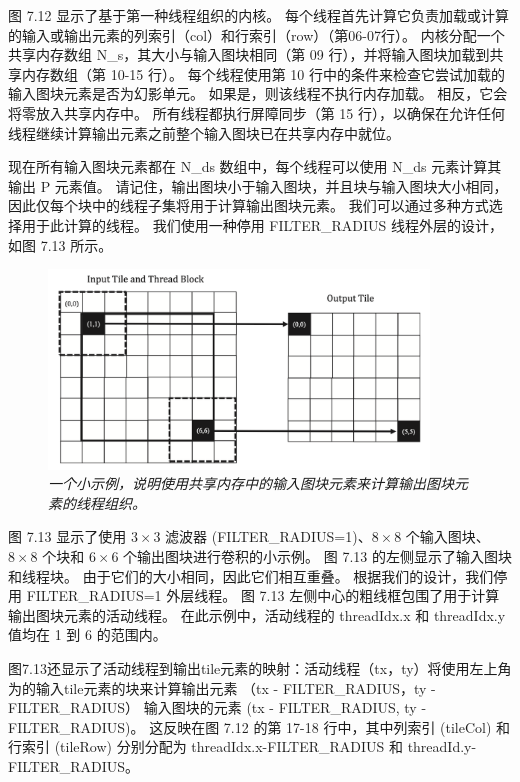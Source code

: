 图 7.12 显示了基于第一种线程组织的内核。 
每个线程首先计算它负责加载或计算的输入或输出元素的列索引（col）和行索引（row）（第06-07行）。 
内核分配一个共享内存数组 N\_s，其大小与输入图块相同（第 09 行），并将输入图块加载到共享内存数组（第 10-15 行）。 
每个线程使用第 10 行中的条件来检查它尝试加载的输入图块元素是否为幻影单元。 
如果是，则该线程不执行内存加载。 相反，它会将零放入共享内存中。 
所有线程都执行屏障同步（第 15 行），以确保在允许任何线程继续计算输出元素之前整个输入图块已在共享内存中就位。

现在所有输入图块元素都在 N\_ds 数组中，每个线程可以使用 N\_ds 元素计算其输出 P 元素值。 
请记住，输出图块小于输入图块，并且块与输入图块大小相同，因此仅每个块中的线程子集将用于计算输出图块元素。 
我们可以通过多种方式选择用于此计算的线程。 我们使用一种停用 FILTER\_RADIUS 线程外层的设计，如图 7.13 所示。

\begin{figure}[H]
	\centering
	\includegraphics[width=0.9\textwidth]{figs/F7.13.png}
	\caption{\textit{一个小示例，说明使用共享内存中的输入图块元素来计算输出图块元素的线程组织。}}
\end{figure}

图 7.13 显示了使用 $3 \times 3$ 滤波器 (FILTER\_RADIUS=1)、$8 \times 8$ 个输入图块、
$8 \times 8$ 个块和 $6 \times 6$ 个输出图块进行卷积的小示例。 
图 7.13 的左侧显示了输入图块和线程块。 由于它们的大小相同，因此它们相互重叠。 
根据我们的设计，我们停用 FILTER\_RADIUS=1 外层线程。 
图 7.13 左侧中心的粗线框包围了用于计算输出图块元素的活动线程。 
在此示例中，活动线程的 threadIdx.x 和 threadIdx.y 值均在 1 到 6 的范围内。

图7.13还显示了活动线程到输出tile元素的映射：活动线程（tx，ty）将使用左上角为的输入tile元素的块来计算输出元素
（tx - FILTER\_RADIUS，ty - FILTER\_RADIUS） 输入图块的元素 (tx - FILTER\_RADIUS, ty - FILTER\_RADIUS)。 
这反映在图 7.12 的第 17-18 行中，其中列索引 (tileCol) 和行索引 (tileRow) 
分别分配为 threadIdx.x-FILTER\_RADIUS 和 threadId.y-FILTER\_RADIUS。

